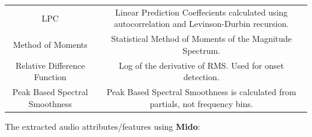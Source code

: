 \documentclass[11pt]{article}
\begin{document}
\begin{longtable}[c]{@{}cc@{}}
\begin{minipage}[t]{0.15\columnwidth}
LPC
\strut\end{minipage} &
\begin{minipage}[t]{0.79\columnwidth}\centering\strut
Linear Prediction Coeffecients calculated using autocorrelation and
Levinson-Durbin recursion.
\strut\end{minipage}\tabularnewline
\begin{minipage}[t]{0.15\columnwidth}\centering\strut
Method of Moments
\strut\end{minipage} &
\begin{minipage}[t]{0.79\columnwidth}\centering\strut
Statistical Method of Moments of the Magnitude Spectrum.
\strut\end{minipage}\tabularnewline
\begin{minipage}[t]{0.15\columnwidth}\centering\strut
Relative Difference Function
\strut\end{minipage} &
\begin{minipage}[t]{0.79\columnwidth}\centering\strut
Log of the derivative of RMS. Used for onset detection.
\strut\end{minipage}\tabularnewline
\begin{minipage}[t]{0.15\columnwidth}\centering\strut
Peak Based Spectral Smoothness
\strut\end{minipage} &
\begin{minipage}[t]{0.79\columnwidth}\centering\strut
Peak Based Spectral Smoothness is calculated from partials, not
frequency bins.
\strut\end{minipage}\tabularnewline
\bottomrule
\end{longtable}

\newpage

The extracted audio attributes/features using \textbf{Mido}:
\end{document}
